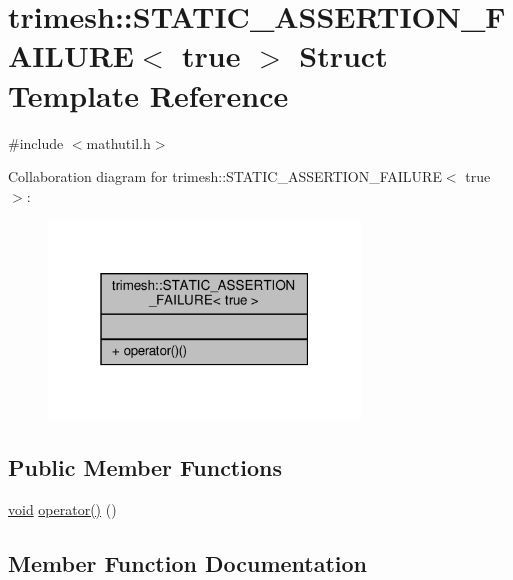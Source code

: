 \hypertarget{structtrimesh_1_1STATIC__ASSERTION__FAILURE_3_01true_01_4}{}\section{trimesh\+:\+:S\+T\+A\+T\+I\+C\+\_\+\+A\+S\+S\+E\+R\+T\+I\+O\+N\+\_\+\+F\+A\+I\+L\+U\+RE$<$ true $>$ Struct Template Reference}
\label{structtrimesh_1_1STATIC__ASSERTION__FAILURE_3_01true_01_4}


{\ttfamily \#include $<$mathutil.\+h$>$}



Collaboration diagram for trimesh\+:\+:S\+T\+A\+T\+I\+C\+\_\+\+A\+S\+S\+E\+R\+T\+I\+O\+N\+\_\+\+F\+A\+I\+L\+U\+RE$<$ true $>$\+:\nopagebreak
\begin{figure}[H]
\begin{center}
\leavevmode
\includegraphics[width=235pt]{de/db0/structtrimesh_1_1STATIC__ASSERTION__FAILURE_3_01true_01_4__coll__graph}
\end{center}
\end{figure}
\subsection*{Public Member Functions}
\begin{DoxyCompactItemize}
\item 
\hyperlink{namespacetrimesh_a784ddfd979e1c579bda795a8edfc3f43}{void} \hyperlink{structtrimesh_1_1STATIC__ASSERTION__FAILURE_3_01true_01_4_a6581a26b1881a19644b92cef88a6bbf4}{operator()} ()
\end{DoxyCompactItemize}


\subsection{Member Function Documentation}
\mbox{\label{structtrimesh_1_1STATIC__ASSERTION__FAILURE_3_01true_01_4_a6581a26b1881a19644b92cef88a6bbf4}} 
